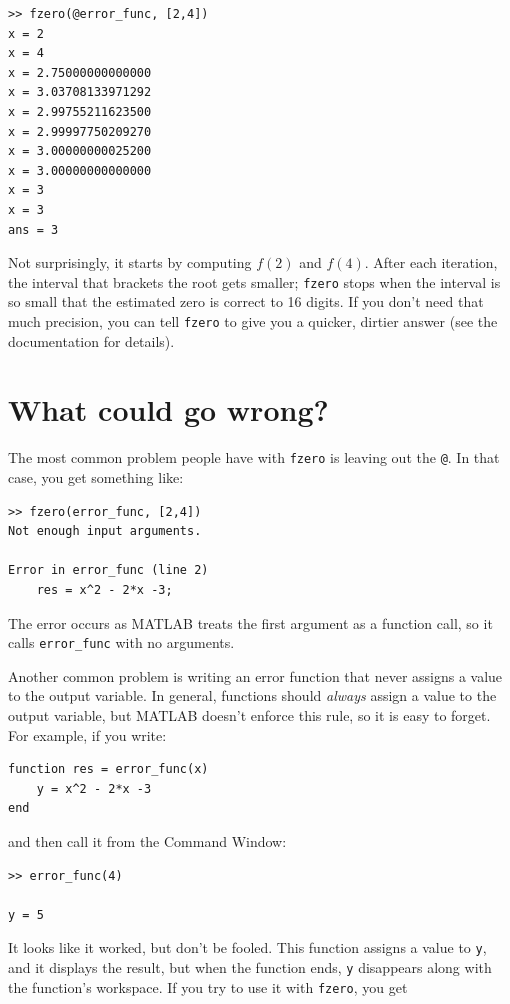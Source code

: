 \documentclass{book}
\begin{document}
\begin{verbatim}
>> fzero(@error_func, [2,4])
x = 2
x = 4
x = 2.75000000000000
x = 3.03708133971292
x = 2.99755211623500
x = 2.99997750209270
x = 3.00000000025200
x = 3.00000000000000
x = 3
x = 3
ans = 3
\end{verbatim}

Not surprisingly, it starts by computing $f(2)$ and $f(4)$.  After
each iteration, the interval that brackets the root gets smaller;
{\tt fzero} stops when the interval is so small that the estimated
zero is correct to 16 digits.  If you
don't need that much precision, you can tell {\tt fzero} to give
you a quicker, dirtier answer (see the documentation for details).


\section{What could go wrong?}

The most common problem people have with {\tt fzero} is leaving
out the {\tt @}.  In that case, you get something like:

\begin{verbatim}
>> fzero(error_func, [2,4])
Not enough input arguments.

Error in error_func (line 2)
    res = x^2 - 2*x -3;
\end{verbatim}

The error occurs as MATLAB treats the first argument as a function call,
so it calls {\tt error\_func} with no arguments.

Another common problem is writing an error function that never
assigns a value to the output variable.  In general, functions should
{\em always} assign a value to the output variable, but MATLAB doesn't
enforce this rule, so it is easy to forget.  For example, if you
write:

\begin{verbatim}
function res = error_func(x)
    y = x^2 - 2*x -3
end
\end{verbatim}

and then call it from the Command Window:

\begin{verbatim}
>> error_func(4)

y = 5
\end{verbatim}

It looks like it worked, but don't be fooled.  This function assigns
a value to {\tt y}, and it displays the result, but when the function
ends, {\tt y} disappears along with the function's workspace.
If you try to use it with {\tt fzero}, you get
\end{document}
